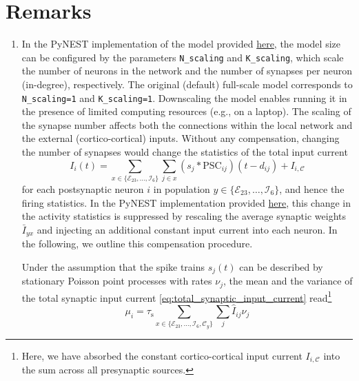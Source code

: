 \documentclass[10pt,a4paper,twoside,american]{article}
\theoremstyle{definitionstyle}
\newcommand{\tauS}{\tau_\text{s}}
\begin{document}
\section{Remarks}
\label{sec:remarks}
\begin{enumerate}
\item \label{remark:network_scaling}
  In the PyNEST implementation of the model provided \href{https://github.com/INM-6/microcircuit-PD14-model}{here}, the model size can be configured by the parameters \texttt{N\_scaling} and \texttt{K\_scaling}, which scale the number of neurons in the network and the number of synapses per neuron (in-degree), respectively. 
  The original (default) full-scale model corresponds to \texttt{N\_scaling=1} and \texttt{K\_scaling=1}.
  Downscaling the model enables running it in the presence of limited computing resources (e.g., on a laptop).
  The scaling of the synapse number affects both the connections within the local network and the external (cortico-cortical) inputs.
  Without any compensation, changing the number of synapses would change the statistics of the total input current
  \begin{equation}
    \label{eq:total_synaptic_input_current}
    I_i(t)=\sum_{x\in\{\mathcal{E}_{23},\ldots,\mathcal{I}_{6}\}} \sum_{j\in{}x} (s_j* \text{PSC}_{ij})(t-d_{ij}) + I_{i,\mathcal{C}}
  \end{equation}
  for each postsynaptic neuron $i$ in population $y\in\{\mathcal{E}_{23},\ldots,\mathcal{I}_{6}\}$, and hence the firing statistics.
  In the PyNEST implementation provided \href{https://github.com/INM-6/microcircuit-PD14-model}{here}, this change in the activity statistics is suppressed by rescaling the average synaptic weights $\bar{I}_{yx}$ and injecting an additional constant input current into each neuron.
  In the following, we outline this compensation procedure.
  \par  
  Under the assumption that the spike trains $s_j(t)$ can be described by stationary Poisson point processes with rates $\nu_j$, the mean and the variance of the total synaptic input current \cref{eq:total_synaptic_input_current} read\footnote{Here, we have absorbed the constant cortico-cortical input current $I_{i,\mathcal{C}}$ into the sum across all presynaptic sources.}
  \begin{equation}
    \label{eq:mean_and_variances_synaptic_input}
      \mu_i      =             \tauS \sum_{x\in\{\mathcal{E}_{23},\ldots,\mathcal{I}_{6},\mathcal{C}_y\}} \sum_j \hat{I}_{ij}   \nu_j 

\end{equation}
\end{enumerate}
\end{document}
